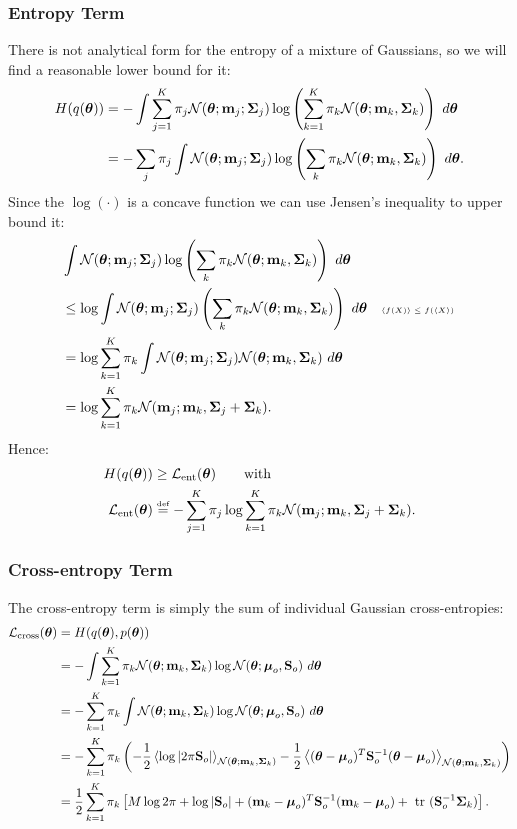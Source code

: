 \subsubsection{Entropy Term}
There is not analytical form for the entropy of a mixture of Gaussians, so we will find a reasonable lower bound for it:
\begin{align}
	H(q(\vectheta)) &= - \int \sum_{j=1}^{K} \pi_{j} \Normal(\vectheta; \mqj; \Sigmaqj) \log \left(\sum_{k=1}^{K} \pi_{k} \Normal(\vectheta; \mqk, \Sigmaqk) \right) \ d\vectheta \\
&= - \sum_{j} \pi_{j} \int 	 \Normal(\vectheta; \mqj; \Sigmaqj)  \log \left( \sum_{k} \pi_{k}\Normal(\vectheta; \mqk, \Sigmaqk)  \right)\ d\vectheta \text{.}
\end{align}
Since the $\log(\cdot)$ is a concave function we can use Jensen's inequality to upper bound it:
\begin{align}
	& \int \Normal(\vectheta; \mqj; \Sigmaqj) \log \left(  \sum_{k} \pi_{k} \Normal(\vectheta; \mqk, \Sigmaqk)  \right) \dtheta \\
	& \leq  \log \int \Normal(\vectheta; \mqj; \Sigmaqj)  \left(  \sum_{k} \pi_{k} \Normal(\vectheta; \mqk, \Sigmaqk)  \right) \dtheta 
	\quad \text{\tiny $\Eb{f(X)} \leq f(\Eb{X})$ } \\
	&= \log \sum_{k=1}^{K} \pi_{k} \int \Normal(\vectheta; \mqj; \Sigmaqj) \Normal(\vectheta; \mqk, \Sigmaqk)  \dtheta \\
	& = \log \sum_{k=1}^{K} \pi_{k} \Normal(\mqj; \mqk, \Sigmaqj + \Sigmaqk ) \text{.}
\end{align}
Hence:
\begin{align}
	H(q(\vectheta)) & \geq  \lent(\vectheta)  \qquad \text{with }\\
	 \lent(\vectheta) & \defeq - \sum_{j=1}^{K} \pi_{j} \log \sum_{k=1}^{K} \pi_{k} \Normal(\mqj; \mqk, \Sigmaqj + \Sigmaqk )  
	  \text{.}
\end{align} 
%
\subsubsection{Cross-entropy Term}
The cross-entropy term is simply the sum of individual Gaussian cross-entropies:
\begin{align}
\lcross(\vectheta) &= H(q(\vectheta), p(\vectheta)) \\
&=  - \int \sum_{k=1}^{K} \pi_{k}\Normal(\vectheta; \mqk, \Sigmaqk) \log \Normal(\vectheta; \muo, \Sigmao) \dtheta \\
& = - \sum_{k=1}^{K} \pi_{k}  \int \Normal(\vectheta; \mqk, \Sigmaqk) \log \Normal(\vectheta; \muo, \Sigmao) \dtheta \\
& = - \sum_{k=1}^{K} \pi_{k}  \left(-\frac{1}{2} \Eb{\log \det{2 \pi \Sigmao}}_{\Normal(\vectheta; \mqk, \Sigmaqk)} 
- \frac{1}{2} \Eb{(\vectheta - \muo)^{T} \Sigmao^{-1} (\vectheta - \muo)}_{\Normal(\vectheta; \mqk, \Sigmaqk)} \right) \\
&= \frac{1}{2} \sum_{k=1}^{K} \pi_{k} \left[ M \log 2\pi + \log \det{\Sigmao} + (\mqk-\muo)^{T} \Sigmao^{-1}(\mqk-\muo) 
+ \trace(\Sigmao^{-1} \Sigmaqk) \right] \text{.}
\end{align}
%
